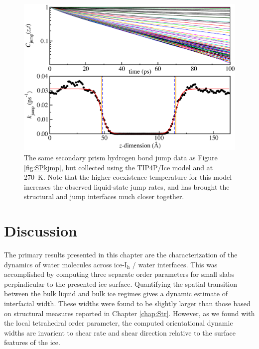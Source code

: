 \begin{figure}
\includegraphics[width=\linewidth]{Figures/secprismJumpPlotTIP4PIce}
\caption{\label{fig:SPTIP4Pkjmp} The same secondary prism hydrogen
  bond jump data as Figure \ref{fig:SPkjmp}, but collected using the
  TIP4P/Ice model and at 270~K.  Note that the higher coexistence
  temperature for this model increases the observed liquid-state jump
  rates, and has brought the structural and jump interfaces much
  closer together.}
\end{figure}


\section{Discussion}
The primary results presented in this chapter are the characterization
of the dynamics of water molecules across ice-I$_\mathrm{h}$ / water
interfaces. This was accomplished by computing three separate order
parameters for small slabs perpindicular to the presented ice
surface. Quantifying the spatial transition between the bulk liquid
and bulk ice regimes gives a dynamic estimate of interfacial
width. These widths were found to be slightly larger than those based
on structural measures reported in Chapter \ref{chap:Str}. However, as
we found with the local tetrahedral order parameter, the computed
orientational dynamic widths are invarient to shear rate and shear
direction relative to the surface features of the ice.

